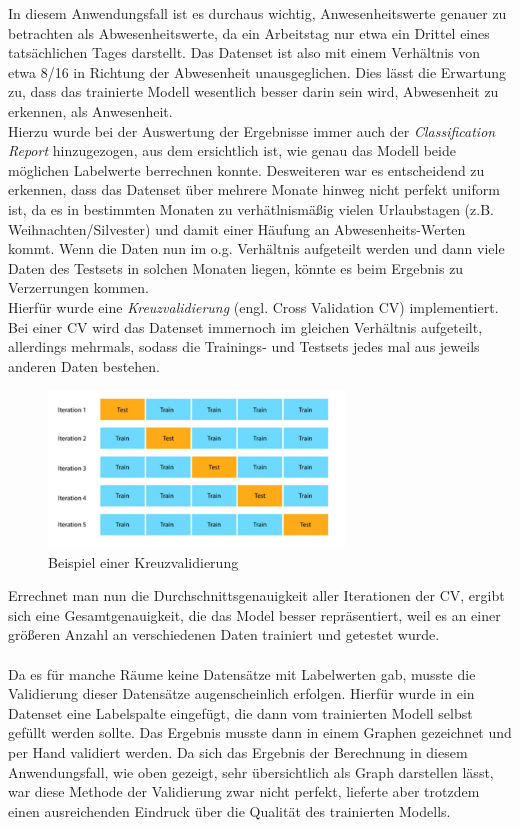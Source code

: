 \vspace{0.75cm}
In diesem Anwendungsfall ist es durchaus wichtig, Anwesenheitswerte genauer zu betrachten als 
Abwesenheitswerte, da ein Arbeitstag nur etwa ein Drittel eines tatsächlichen Tages darstellt. 
Das Datenset ist also mit einem Verhältnis von etwa 8/16 in Richtung der Abwesenheit unausgeglichen. Dies 
lässt die Erwartung zu, dass das trainierte Modell wesentlich besser darin sein wird, Abwesenheit zu erkennen,
als Anwesenheit.\\
Hierzu wurde bei der Auswertung der Ergebnisse immer auch der \textit{Classification Report} hinzugezogen,
aus dem ersichtlich ist, wie genau das Modell beide möglichen Labelwerte berrechnen konnte.
\newpage
Desweiteren war es entscheidend zu erkennen, dass das Datenset über mehrere Monate hinweg nicht perfekt uniform 
ist, da es in bestimmten Monaten zu verhätlnismäßig vielen Urlaubstagen (z.B. Weihnachten/Silvester) und damit 
einer Häufung an Abwesenheits-Werten kommt.
Wenn die Daten nun im o.g. Verhältnis aufgeteilt werden und dann viele Daten des Testsets in solchen Monaten 
liegen, könnte es beim Ergebnis zu Verzerrungen kommen.\\
Hierfür wurde eine \textit{Kreuzvalidierung} (engl. Cross Validation CV) implementiert. Bei einer CV wird das 
Datenset immernoch im gleichen Verhältnis aufgeteilt, allerdings mehrmals, sodass die Trainings- und Testsets 
jedes mal aus jeweils anderen Daten bestehen.

\begin{figure}[h]
    \centering
    \includegraphics[width=0.7\textwidth]{pic/CV.png}
    \caption{Beispiel einer Kreuzvalidierung}
    \label{fig:CV}
\end{figure}

Errechnet man nun die Durchschnittsgenauigkeit aller Iterationen der CV, ergibt sich eine Gesamtgenauigkeit, 
die das Model besser repräsentiert, weil es an einer größeren Anzahl an verschiedenen Daten trainiert und 
getestet wurde.
\\\\
Da es für manche Räume keine Datensätze mit Labelwerten gab, musste die Validierung dieser Datensätze 
augenscheinlich erfolgen. Hierfür wurde in ein Datenset eine Labelspalte eingefügt, die dann vom trainierten
Modell selbst gefüllt werden sollte. Das Ergebnis musste dann in einem Graphen gezeichnet und per Hand validiert 
werden. Da sich das Ergebnis der Berechnung in diesem Anwendungsfall, wie oben gezeigt, sehr übersichtlich als 
Graph darstellen lässt, war diese Methode der Validierung zwar nicht perfekt, lieferte aber trotzdem einen 
ausreichenden Eindruck über die Qualität des trainierten Modells.


